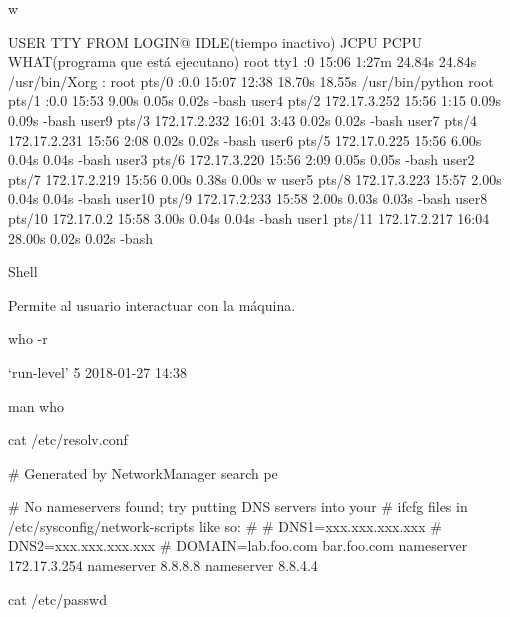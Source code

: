 \documentclass{memoir}
\begin{document}
w

USER     TTY      FROM              LOGIN@   IDLE(tiempo inactivo)   JCPU   PCPU WHAT(programa que está ejecutano)
root     tty1     :0               15:06    1:27m 24.84s 24.84s /usr/bin/Xorg :
root     pts/0    :0.0             15:07   12:38  18.70s 18.55s /usr/bin/python
root     pts/1    :0.0             15:53    9.00s  0.05s  0.02s -bash
user4    pts/2    172.17.3.252     15:56    1:15   0.09s  0.09s -bash
user9    pts/3    172.17.2.232     16:01    3:43   0.02s  0.02s -bash
user7    pts/4    172.17.2.231     15:56    2:08   0.02s  0.02s -bash
user6    pts/5    172.17.0.225     15:56    6.00s  0.04s  0.04s -bash
user3    pts/6    172.17.3.220     15:56    2:09   0.05s  0.05s -bash
user2    pts/7    172.17.2.219     15:56    0.00s  0.38s  0.00s w
user5    pts/8    172.17.3.223     15:57    2.00s  0.04s  0.04s -bash
user10   pts/9    172.17.2.233     15:58    2.00s  0.03s  0.03s -bash
user8    pts/10   172.17.0.2       15:58    3.00s  0.04s  0.04s -bash
user1    pts/11   172.17.2.217     16:04   28.00s  0.02s  0.02s -bash


Shell

Permite al usuario interactuar con la máquina.

who -r

 `run-level' 5 2018-01-27 14:38

 man who

cat /etc/resolv.conf

# Generated by NetworkManager
search pe


# No nameservers found; try putting DNS servers into your
# ifcfg files in /etc/sysconfig/network-scripts like so:
#
# DNS1=xxx.xxx.xxx.xxx
# DNS2=xxx.xxx.xxx.xxx
# DOMAIN=lab.foo.com bar.foo.com
nameserver 172.17.3.254
nameserver 8.8.8.8
nameserver 8.8.4.4

cat /etc/passwd
\end{document}
